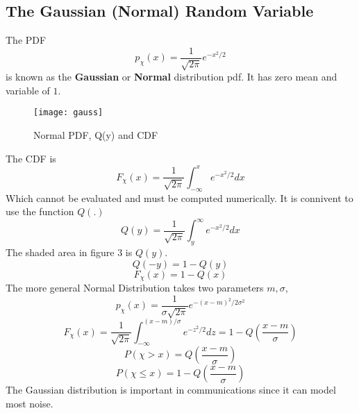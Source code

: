 \documentclass{article}
\begin{document}
    \subsection{ The Gaussian (Normal) Random Variable}
    The PDF
    \begin{equation}
        p_{\chi}(x) = \frac{1}{\sqrt{2\pi}}e^{-x^2/2}
    \end{equation}
    is known as the \textbf{Gaussian} or \textbf{Normal} distribution pdf. It has zero mean and variable of $1$. 

    \begin{figure}[h]
        \centering
        \texttt{[image: gauss]}
        \caption{Normal PDF, Q(y) and CDF}
    \end{figure}

    The CDF is
    \begin{equation}
        F_{\chi}(x) = \frac{1}{\sqrt{2\pi}}\int_{-\infty}^{x}e^{-x^2/2}dx
    \end{equation}
    Which cannot be evaluated and must be computed numerically. It is connivent to use the function $Q(.)$
    \begin{equation}
        Q(y) = \frac{1}{\sqrt{2\pi}}\int_{y}^{\infty}e^{-x^2/2}dx
    \end{equation}
    The shaded area in figure 3 is $Q(y)$. 
    \begin{equation}
        Q(-y) = 1- Q(y)
    \end{equation}
    \begin{equation}
        F_{\chi}(x) = 1-Q(x)
    \end{equation}
    The more general Normal Distribution takes two parameters $m, \sigma$,
    \begin{equation}
        p_{\chi}(x) = \frac{1}{\sigma\sqrt{2\pi}}e^{-(x-m)^2/2\sigma^2}
    \end{equation}
    \begin{equation}
        F_{\chi}(x) = \frac{1}{\sqrt{2\pi}}\int_{-\infty}^{(x-m)/\sigma}e^{-z^2/2}dz = 1 - Q(\frac{x-m}{\sigma})
    \end{equation}
    \begin{equation}
        P(\chi > x) = Q(\frac{x-m}{\sigma})
    \end{equation}
    \begin{equation}
        P(\chi \le x) = 1-Q(\frac{x-m}{\sigma})
    \end{equation}
    The Gaussian distribution is important in communications since it can model most noise. 
\end{document}

